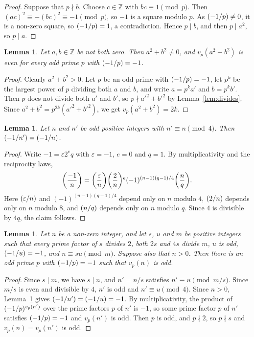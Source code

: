 \documentclass[11pt]{article}
\newtheorem{lemma}[theorem]{Lemma}
\newcommand{\Z}{\mathbb{Z}}
\newcommand{\leg}[2]{\mathchoice{\biggl(\dfrac{#1}{#2}\biggr)}{(#1/#2)}{(#1/#2)}{(#1/#2)}}
\begin{document}
\begin{proof}
Suppose that $p\nmid b$. Choose $c\in\Z$ with $bc\equiv1\pmod p$. Then $(ac)^2\equiv-(bc)^2\equiv-1\pmod p$, so $-1$ is a square modulo $p$. As $\leg{-1}{p}\neq0$, it is a non-zero square, so $\leg{-1}{p}=1$, a contradiction. Hence $p\mid b$, and then $p\mid a^2$, so $p\mid a$.
\end{proof}

\begin{lemma}\label{lem:even}
Let $a,b\in\Z$ be not both zero. Then $a^2+b^2\neq0$, and $v_p(a^2+b^2)$ is even for every odd prime $p$ with $\leg{-1}{p}=-1$.
\end{lemma}

\begin{proof}
Clearly $a^2+b^2>0$. Let $p$ be an odd prime with $\leg{-1}{p}=-1$, let $p^k$ be the largest power of $p$ dividing both $a$ and $b$, and write $a=p^ka'$ and $b=p^kb'$. Then $p$ does not divide both $a'$ and $b'$, so $p\nmid a'^2+b'^2$ by Lemma~\ref{lem:divides}. Since $a^2+b^2=p^{2k}(a'^2+b'^2)$, we get $v_p(a^2+b^2)=2k$.
\end{proof}

\begin{lemma}\label{lem:period}
Let $n$ and $n'$ be odd positive integers with $n'\equiv n\pmod{4}$. Then $\leg{-1}{n'}=\leg{-1}{n}$.
\end{lemma}

\begin{proof}
Write $-1=\varepsilon2^eq$ with $\varepsilon=-1$, $e=0$ and $q=1$. By multiplicativity and the reciprocity laws,
\[
\leg{-1}{n}=\leg{\varepsilon}{n}\leg{2}{n}^e(-1)^{(n-1)(q-1)/4}\leg{n}{q}.
\]
Here $\leg{\varepsilon}{n}$ and $(-1)^{(n-1)(q-1)/4}$ depend only on $n$ modulo $4$, $\leg{2}{n}$ depends only on $n$ modulo $8$, and $\leg{n}{q}$ depends only on $n$ modulo $q$. Since $4$ is divisible by $4q$, the claim follows.
\end{proof}

\begin{lemma}\label{lem:odd}
Let $n$ be a non-zero integer, and let $s$, $u$ and $m$ be positive integers such that every prime factor of $s$ divides $2$, both $2s$ and $4s$ divide $m$, $u$ is odd, $\leg{-1}{u}=-1$, and $n\equiv su\pmod m$. Suppose also that $n>0$. Then there is an odd prime $p$ with $\leg{-1}{p}=-1$ such that $v_p(n)$ is odd.
\end{lemma}

\begin{proof}
Since $s\mid m$, we have $s\mid n$, and $n'=n/s$ satisfies $n'\equiv u\pmod{m/s}$. Since $m/s$ is even and divisible by $4$, $n'$ is odd and $n'\equiv u\pmod{4}$. Since $n>0$, Lemma~\ref{lem:period} gives $\leg{-1}{n'}=\leg{-1}{u}=-1$. By multiplicativity, the product of $\leg{-1}{p}^{v_p(n')}$ over the prime factors $p$ of $n'$ is $-1$, so some prime factor $p$ of $n'$ satisfies $\leg{-1}{p}=-1$ and $v_p(n')$ is odd. Then $p$ is odd, and $p\nmid2$, so $p\nmid s$ and $v_p(n)=v_p(n')$ is odd.
\end{proof}
\end{document}
